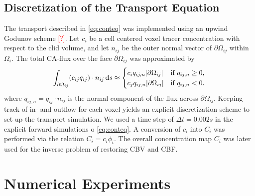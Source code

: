 \documentclass[paper=a4, fontsize=11pt,parskip=half,headings=small]{scrartcl}
\newcommand{\missingsource}{\textcolor{red}{[?]}}
\begin{document}
	\subsection{Discretization of the Transport Equation} \label{sec:numtrans}
	The transport described in \eqref{eq:conteq} was implemented using an upwind Godunov scheme \missingsource.
	Let $c_i$ be a cell centered voxel tracer concentration with respect to the clid volume, and let $n_{ij}$ be the outer normal vector of $\partial \Omega_{ij}$ within $\Omega_i$.
	The total CA-flux over the face $\partial \Omega_{ij}$ was approximated by
	\begin{equation}
	\int_{\partial \Omega_{ij}} (c_{ij} q_{ij})\cdot n_{ij} \,\mathrm{d} s \approx
	\begin{cases}
	c_i q_{ij,n} \vert \partial \Omega_{ij} \vert & \text{if } q_{ij,n} \geq 0,\\
	c_j q_{ij,n} \vert \partial \Omega_{ij} \vert & \text{if } q_{ij,n} < 0.
	\end{cases}
	\end{equation}
	where $q_{ij,n} = q_{ij} \cdot n_{ij}$ is the normal component of the flux across $\partial \Omega_{ij}$.
	Keeping track of in- and outflow for each voxel yields an explicit discretization scheme to set up the transport simulation. We used a time step of $\Delta t = 0.002 s$ in the explicit forward simulations o \eqref{eq:conteq}.
	A conversion of $c_i$ into $C_i$ was performed via the relation $C_i = c_i\phi_i$. The overall concentration map $C_i$ was later used for the inverse problem of restoring CBV and CBF.





	\section{Numerical Experiments}\label{sec:NumExp}
\end{document}
